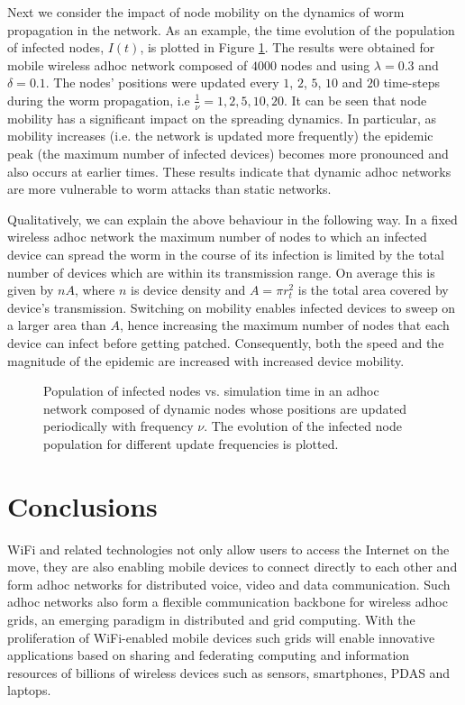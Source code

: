 \documentclass{elsart}
\begin{document}
Next we consider the impact of node mobility on the dynamics of worm 
propagation in the network. As an example, 
the time evolution of the population of infected nodes, $I(t)$, is
plotted in Figure \ref{f:it}. The results were obtained for mobile 
wireless adhoc network composed of $4000$ nodes and 
using  $\lambda=0.3$ and $\delta=0.1$. 
The nodes' positions were updated every $1$, $2$, $5$, $10$ and $20$ 
time-steps during 
the worm propagation, i.e $\frac 1 \nu = 1, 2, 5, 10, 20$. It can be seen 
that node mobility has a significant impact on the spreading dynamics.
In particular, as mobility increases (i.e. the network is updated 
more frequently) the epidemic peak (the maximum number of 
infected devices) becomes more pronounced 
and also occurs at earlier times. These results 
indicate that dynamic adhoc networks are  more vulnerable to  
worm attacks than static networks. 

Qualitatively, we can explain the above behaviour in the following way. 
In a fixed wireless adhoc network the  maximum number of nodes to 
which an infected device can spread the worm in the course of its 
infection is limited by the 
total number of devices which are within its transmission range. On average 
this is given by $nA$, where $n$ is device density and $A=\pi r_t^2$ is 
the total area covered by device's transmission. Switching on mobility enables 
infected devices to sweep on a larger area than $A$,
hence increasing the maximum  number of nodes that  each device can infect 
before getting patched. Consequently, both the speed and the magnitude of the 
epidemic are increased with increased device mobility.

\begin{figure}
\centering
{}
\caption{Population of infected nodes vs. simulation time in an adhoc network
composed of dynamic nodes whose positions are updated periodically with frequency
$\nu$. The evolution of the infected node population for different update
frequencies is plotted.}
\label{f:it}
\end{figure}


\section{Conclusions}
WiFi and related technologies not only allow  users to access the Internet 
on the move, they are also enabling mobile devices to connect directly 
to each other and  form adhoc networks for distributed 
voice, video and data communication. Such adhoc networks also form a flexible 
communication backbone for wireless adhoc grids, an emerging paradigm in 
distributed and grid computing.
With the proliferation of WiFi-enabled mobile devices such grids will 
enable innovative applications based on sharing and federating 
computing and information resources of billions of wireless devices such as
sensors, smartphones, PDAS and laptops.
\end{document}
